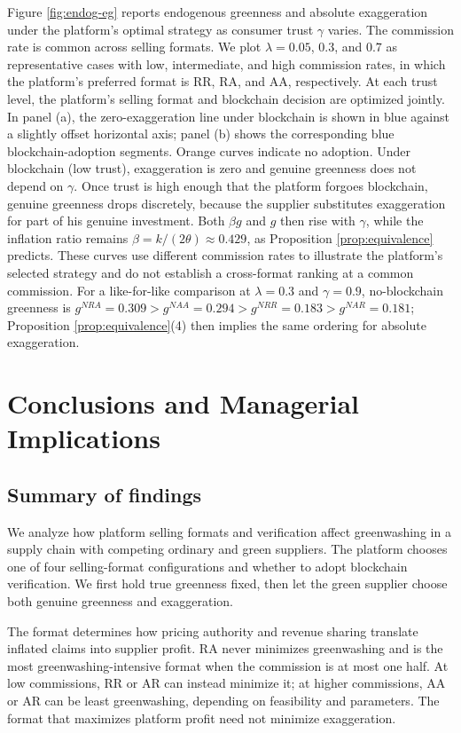 \documentclass[preprint,review,12pt,authoryear,nopreprintline]{elsarticle}
\theoremstyle{definition}
\begin{document}
Figure \ref{fig:endog-eg} reports endogenous greenness and absolute exaggeration under the platform's optimal strategy as consumer trust $\gamma$ varies. The commission rate is common across selling formats. We plot $\lambda=0.05$, $0.3$, and $0.7$ as representative cases with low, intermediate, and high commission rates, in which the platform's preferred format is RR, RA, and AA, respectively. At each trust level, the platform's selling format and blockchain decision are optimized jointly. In panel (a), the zero-exaggeration line under blockchain is shown in blue against a slightly offset horizontal axis; panel (b) shows the corresponding blue blockchain-adoption segments. Orange curves indicate no adoption. Under blockchain (low trust), exaggeration is zero and genuine greenness does not depend on $\gamma$. Once trust is high enough that the platform forgoes blockchain, genuine greenness drops discretely, because the supplier substitutes exaggeration for part of his genuine investment. Both $\beta g$ and $g$ then rise with $\gamma$, while the inflation ratio remains $\beta=k/(2\theta)\approx0.429$, as Proposition \ref{prop:equivalence} predicts. These curves use different commission rates to illustrate the platform's selected strategy and do not establish a cross-format ranking at a common commission. For a like-for-like comparison at $\lambda=0.3$ and $\gamma=0.9$, no-blockchain greenness is $g^{NRA}=0.309>g^{NAA}=0.294>g^{NRR}=0.183>g^{NAR}=0.181$; Proposition \ref{prop:equivalence}(4) then implies the same ordering for absolute exaggeration.

\section{Conclusions and Managerial Implications}\label{sec:6}

\subsection{Summary of findings}

We analyze how platform selling formats and verification affect greenwashing in a supply chain with competing ordinary and green suppliers. The platform chooses one of four selling-format configurations and whether to adopt blockchain verification. We first hold true greenness fixed, then let the green supplier choose both genuine greenness and exaggeration.

The format determines how pricing authority and revenue sharing translate inflated claims into supplier profit. RA never minimizes greenwashing and is the most greenwashing-intensive format when the commission is at most one half. At low commissions, RR or AR can instead minimize it; at higher commissions, AA or AR can be least greenwashing, depending on feasibility and parameters. The format that maximizes platform profit need not minimize exaggeration.
\end{document}
